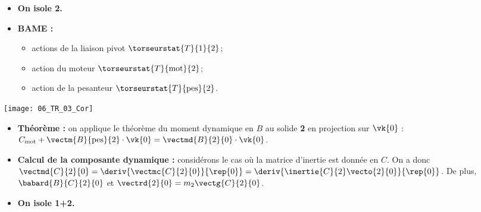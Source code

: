 \vspace{.5cm}

\begin{itemize}
\item \textbf{On isole 2.}
\end{itemize}

\begin{minipage}[c]{.6\linewidth}
\begin{itemize}
\item \textbf{BAME :}
\begin{itemize}
\item actions de la liaison pivot $\torseurstat{T}{1}{2}$;
\item action du moteur $\torseurstat{T}{\text{mot}}{2}$;
\item action de la pesanteur $\torseurstat{T}{\text{pes}}{2}$.
\end{itemize}
\end{itemize}
\end{minipage} \hfil
\begin{minipage}[c]{.35\linewidth}
\begin{center}
\texttt{[image: 06\_TR\_03\_Cor]}
\end{center}
\end{minipage}

\begin{itemize}
\item \textbf{Théorème :} on applique le théorème du moment dynamique en $B$ au solide \textbf{2} en projection sur $\vk{0}$ : $C_{\text{mot}}+\vectm{B}{\text{pes}}{2}\cdot \vk{0}  = \vectmd{B}{2}{0}\cdot \vk{0}$.
\item \textbf{Calcul de la composante dynamique :} considérons le cas où la matrice d'inertie est donnée en $C$. On a donc 
$\vectmd{C}{2}{0}= \deriv{\vectmc{C}{2}{0}}{\rep{0}}=\deriv{\inertie{C}{2}\vecto{2}{0}}{\rep{0}}$. De plus, 
$\babard{B}{C}{2}{0}$ et $\vectrd{2}{0}=m_2 \vectg{C}{2}{0}$.
\end{itemize}

\vspace{.5cm}

\begin{itemize}
\item \textbf{On isole 1+2.}
\end{itemize}

